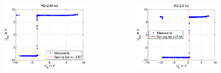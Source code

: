 \begin{frame}
\frametitle{}
\framesubtitle{}
    \begin{columns}[c]

    \begin{figure}[H]
    \begin{center}
            \includegraphics[scale=0.32]{./img/plots/Auf_1_2_63_Ohm.eps}
    \end{center}
    \end{figure}
    \begin{figure}[H]
    \begin{center}
            \includegraphics[scale=0.32]{./img/plots/Auf_1_2_8_Ohm_1.eps}

\end{center}
\end{figure}
\end{columns}
\end{frame}
